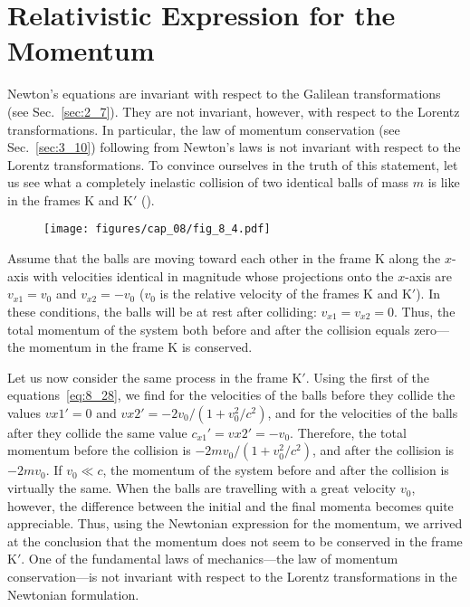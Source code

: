 \section{Relativistic Expression for the Momentum}\label{sec:8_6}

Newton's equations are invariant with respect to the Galilean transformations (see Sec.~\ref{sec:2_7}). They are not invariant, however, with respect to the Lorentz transformations. In particular, the law of momentum conservation (see Sec.~\ref{sec:3_10}) following from Newton's laws is not invariant with respect to the Lorentz transformations. To convince ourselves in the truth of this statement, let us see what a completely inelastic collision of two identical balls of mass $m$ is like in the frames K and K$'$ ().

\begin{figure}[t]
	\begin{center}
		\texttt{[image: figures/cap\_08/fig\_8\_4.pdf]}
		\caption[]{}
		\label{fig:8_4}
	\end{center}
	\vspace{-0.8cm}
\end{figure}

Assume that the balls are moving toward each other in the frame K along the $x$-axis with velocities identical in magnitude whose projections onto the $x$-axis are $v_{x1}=v_0$ and $v_{x2}=-v_0$ ($v_0$ is the relative velocity of the frames K and K$'$). In these conditions, the balls will be at rest after colliding: $v_{x1}=v_{x2}=0$. Thus, the total momentum of the system both before and after the collision equals zero---the momentum in the frame K is conserved.

Let us now consider the same process in the frame K$'$. Using the first of the equations~\eqref{eq:8_28}, we find for the velocities of the balls before they collide the values $v{x1}'=0$ and $v{x2}'=-2v_0/(1+v_0^2/c^2)$, and for the velocities of the balls after they collide the same value $c_{x1}'=v{x2}'=-v_0$. Therefore, the total momentum before the collision is $-2mv_0/(1+v_0^2/c^2)$, and after the collision is $-2mv_0$. If $v_0\ll c$, the momentum of the system before and after the collision is virtually the same. When the balls are travelling with a great velocity $v_0$, however, the difference between the initial and the final momenta becomes quite appreciable. Thus, using the Newtonian expression for the momentum, we arrived at the conclusion that the momentum does not seem to be conserved in the frame K$'$. One of the fundamental laws of mechanics---the law of momentum conservation---is not invariant with respect to the Lorentz transformations in the Newtonian formulation.


